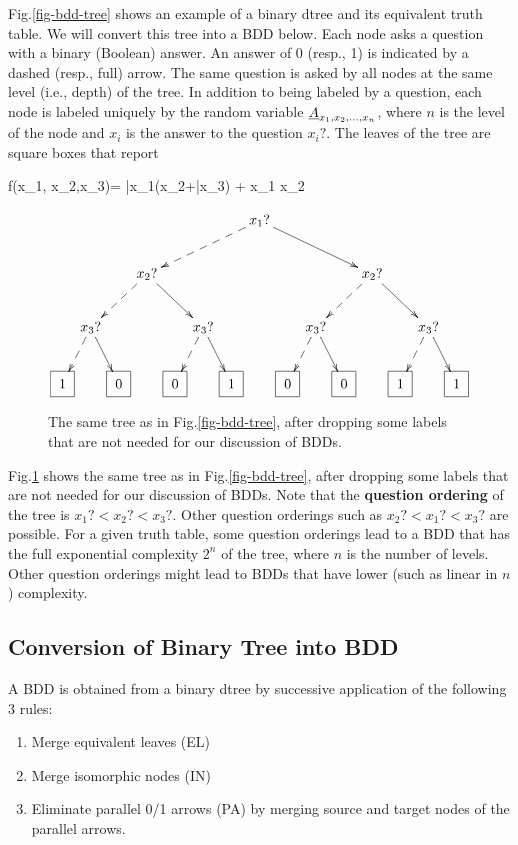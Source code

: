 Fig.\ref{fig-bdd-tree} shows an
example of a binary dtree and its 
equivalent truth table.
We will  convert this tree 
 into a BDD below. Each node asks a question with a binary (Boolean) answer. An answer of 0 (resp., 1) is indicated by a dashed (resp., full) arrow. The same question is asked by all nodes at the same level (i.e., depth) of the tree. In addition to being labeled by a question, each node is labeled uniquely by the random variable $\rvA_{x_1, x_2, \ldots, x_n}$,
where $n$ is the level of the node
and $x_i$ is the answer to the question $x_i?$.
The leaves of
the tree are square boxes that report 

\beq
f(x_1, x_2,x_3)=
\bar{x}_1(x_2+\bar{x}_3)  + x_1 x_2
\label{eq-bdd-truth-table}
\eeq
\begin{figure}[h!]
$$
\xymatrix@C=.1pc{
&&&&&&&x_1?\ar@{-->}[dllll]
\ar[drrrr]
\\
&&&x_2?\ar@{-->}[dll]\ar[drr]
&&&&&&&&x_2?\ar@{-->}[dll]\ar[drr]
\\
&x_3?\ar@{-->}[dl]\ar[dr]
&&&&x_3?\ar@{-->}[dl]\ar[dr]
&&&&x_3?\ar@{-->}[dl]\ar[dr]
&&&&x_3?\ar@{-->}[dl]\ar[dr]
\\
\Rect{1}
&&\Rect{0}
&&\Rect{0}
&&\Rect{1}
&&\Rect{0}
&&\Rect{0}
&&\Rect{1}
&&\Rect{1}
}
$$
\caption{The same tree as in Fig.\ref{fig-bdd-tree}, after dropping 
some labels that are not needed
for our discussion of BDDs.}
\label{fig-bdd-tree-simp}
\end{figure}


Fig.\ref{fig-bdd-tree-simp} shows
the same tree as in  Fig.\ref{fig-bdd-tree}, after dropping 
some labels that are not needed
for our discussion of BDDs.
Note that the {\bf question ordering} of the tree is
$x_1?<x_2?<x_3?$. Other question
orderings such as $x_2?< x_1? < x_3?$
are possible. For a given
truth table, some question 
orderings lead to a BDD 
that has the full  
exponential complexity $2^n$
of the tree, where $n$ is 
the number of levels. Other question orderings
might lead to BDDs that have lower (such as linear in $n$) 
complexity.



\subsection{Conversion of Binary Tree into BDD}

A BDD is obtained
from a binary dtree by 
successive application of the
following
3 rules:

\begin{enumerate}
\item Merge equivalent leaves (EL)
\item Merge isomorphic nodes (IN)
\item Eliminate parallel 0/1 arrows (PA) by merging source
and target nodes of the parallel  arrows.
\end{enumerate}

